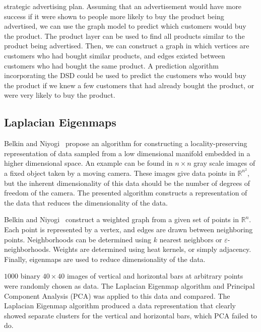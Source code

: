 strategic advertising plan. Assuming that an advertisement would have more success if it were shown
to people more likely to buy the product being advertised, we can use the graph model to predict
which customers would buy the product. The product layer can be used to find all products similar to
the product being advertised. Then, we can construct a graph in which vertices are customers who had
bought similar products, and edges existed between customers who had bought the same product. A
prediction algorithm incorporating the DSD could be used to predict the customers who would buy the
product if we knew a few customers that had already bought the product, or were very likely to buy
the product.


\subsection{Laplacian Eigenmaps} Belkin and Niyogi~\cite{belkin2002laplacian} propose an algorithm
for constructing a locality-preserving representation of data sampled from a low dimensional
manifold embedded in a higher dimensional space. An example can be found in $n\times n$ gray scale
images of a fixed object taken by a moving camera. These images give data points in
$\mathbb{R}^{n^{2}}$, but the inherent dimensionality of this data should be the number of degrees
of freedom of the camera. The presented algorithm constructs a representation of the data that
reduces the dimensionality of the data.

Belkin and Niyogi~\cite{belkin2002laplacian} construct a weighted graph from a given set of points
in $\mathbb{R}^{n}$. Each point is represented by a vertex, and edges are drawn between neighboring
points. Neighborhoods can be determined using $k$ nearest neighbors or $\varepsilon$-neighborhoods.
Weights are determined using heat kernels, or simply adjacency. Finally, eigenmaps are used to
reduce dimensionality of the data.

$1000$ binary $40 \times 40$ images of vertical and horizontal bars at arbitrary points were
randomly chosen as data. The Laplacian Eigenmap algorithm and Principal Component Analysis (PCA) was
applied to this data and compared. The Laplacian Eigenmap algorithm produced a data representation
that clearly showed separate clusters for the vertical and horizontal bars, which PCA failed to do.

